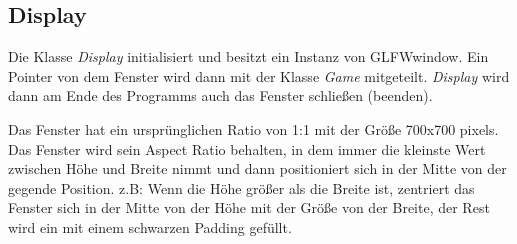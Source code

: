\documentclass[doktyp=studarbeit]{TUBAFarbeiten}
\begin{document}
\subsection{Display}

Die Klasse \textit{Display} initialisiert und besitzt ein Instanz von GLFWwindow. 
Ein Pointer von dem Fenster wird dann mit der Klasse \textit{Game} mitgeteilt. 
\textit{Display} wird dann am Ende des Programms auch das Fenster schließen 
(beenden).

Das Fenster hat ein ursprünglichen Ratio von 1:1 mit der Größe 700x700 pixels.
Das Fenster wird sein Aspect Ratio behalten, in dem immer die kleinste Wert 
zwischen Höhe und Breite nimmt und dann positioniert sich in der Mitte von der 
gegende Position. z.B: Wenn die Höhe größer als die Breite ist, zentriert das 
Fenster sich in der Mitte von der Höhe mit der Größe von der Breite, der Rest
wird ein mit einem schwarzen Padding gefüllt.
\end{document}
